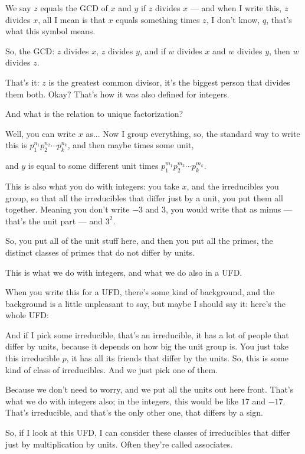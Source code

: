 \begin{speech}[01:18:14 - 01:21:45]
We say $z$ equals the GCD of $x$ and $y$ if $z$ divides $x$ --- and when I write this, $z$ divides $x$, all I mean is that $x$ equals something times $z$,  I don't know, $q$, that's what this symbol means.

So, the GCD: $z$ divides $x$, $z$ divides $y$,  and if $w$ divides $x$ and $w$ divides $y$, then $w$ divides $z$. 

That's it: $z$ is the greatest common divisor, it's the biggest person that divides them both. Okay? That's how it was also defined for integers.

And what is the relation to unique factorization?

Well, you can write $x$ as...  Now I group everything, so, the standard way to write this is $p_1^{n_1} p_2^{n_2} \cdots p_k^{n_k}$, and then maybe times some unit, 

and $y$ is equal to some different unit times $p_1^{m_1} p_2^{m_2} \cdots p_k^{m_k}$. 

This is also what you do with integers: you take $x$, and the irreducibles you group, so that all the irreducibles that differ just by a unit, you put them all together. Meaning you don't write $-3$ and $3$, you would write that as minus --- that's the unit part --- and $3^2$. 

So, you put all of the unit stuff here, and then you put all the primes, the distinct classes of primes that do not differ by units.

This is what we do with integers, and what we do also in a UFD.

When you write this for a UFD, there's some kind of background, and the background is a little unpleasant to say, but maybe I should say it: here's the whole UFD: 

And if I pick some irreducible,  that's an irreducible, it has a lot of people that differ by units, because it depends on how big the unit group is.  You just take this irreducible $p$, it has all its friends that differ by the units. So, this is some kind of class of irreducibles. And we just pick one of them.

Because we don't need to worry, and we put all the units out here front. That's what we do with integers also; in the integers, this would be like $17$ and $-17$.  That's irreducible, and that's the only other one, that differs by a sign.

So, if I look at this UFD, I can consider these classes of irreducibles that differ just by multiplication by units. Often they're called associates.
\end{speech}

